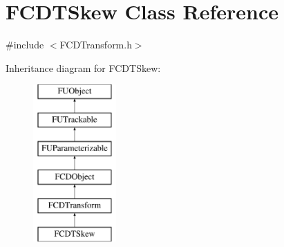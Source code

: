\hypertarget{classFCDTSkew}{
\section{FCDTSkew Class Reference}
\label{classFCDTSkew}
}


{\ttfamily \#include $<$FCDTransform.h$>$}

Inheritance diagram for FCDTSkew:\begin{figure}[H]
\begin{center}
\leavevmode
\includegraphics[height=6.000000cm]{classFCDTSkew}
\end{center}
\end{figure}
